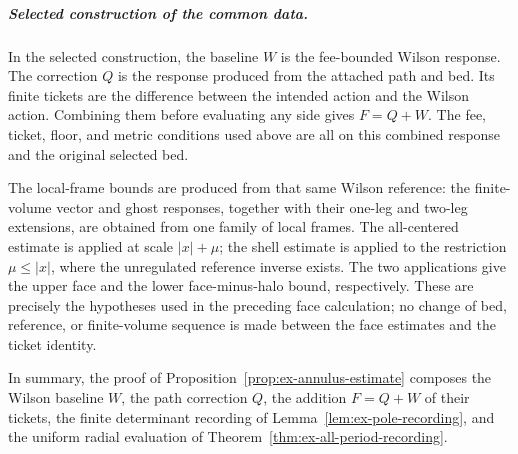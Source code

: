 \subparagraph{Selected construction of the common data.}
In the selected construction, the baseline $W$ is the fee-bounded Wilson
response. The correction $Q$ is the response produced from the attached
path and bed. Its finite tickets are the difference between the intended
action and the Wilson action. Combining them before evaluating any side
gives $F=Q+W$. The fee, ticket, floor, and metric conditions used above
are all on this combined response and the original selected bed.

The local-frame bounds are produced from that same Wilson reference: the
finite-volume vector and ghost responses, together with their one-leg and
two-leg extensions, are obtained from one family of local frames. The
all-centered estimate is applied at scale $|x|+\mu$; the shell estimate is
applied to the restriction $\mu\leq|x|$, where the unregulated reference
inverse exists. The two applications give the upper face and the lower
face-minus-halo bound, respectively. These are precisely the hypotheses
used in the preceding face calculation; no change of bed, reference, or
finite-volume sequence is made between the face estimates and the ticket
identity.

In summary, the proof of Proposition~\ref{prop:ex-annulus-estimate}
composes the Wilson baseline $W$, the path correction $Q$, the addition
$F=Q+W$ of their tickets, the finite determinant recording of
Lemma~\ref{lem:ex-pole-recording}, and the uniform radial evaluation of
Theorem~\ref{thm:ex-all-period-recording}.
